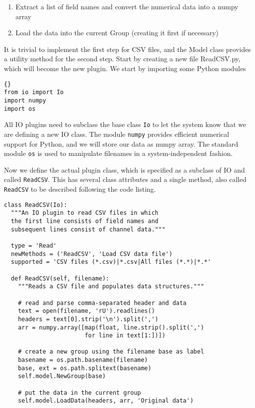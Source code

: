 \documentclass{article}
\begin{document}
\begin{enumerate}
\item Extract a list of field names and convert the numerical data
  into a numpy array
\item Load the data into the current Group (creating it first if necessary)
\end{enumerate}

It is trivial to implement the first step for CSV files, and the Model
class provides a utility method for the second step. Start by creating
a new file ReadCSV.py, which will become the new plugin. We start by
importing some Python modules

\lstset{language=python}
\begin{lstlisting}[]{}
from io import Io
import numpy
import os
\end{lstlisting}

All IO plugins need to subclass the base class \texttt{Io} to let the
system know that we are defining a new IO class. The module
\texttt{numpy} provides efficient numerical support for Python, and we
will store our data as numpy array. The standard module \texttt{os} is
used to manipulate filenames in a system-independent fashion.

Now we define the actual plugin class, which is specified as a
subclass of IO and called \texttt{ReadCSV}. This has several class
attributes and a single method, also called \texttt{ReadCSV} to be
described following the code listing.

\begin{lstlisting}
class ReadCSV(Io):
  """An IO plugin to read CSV files in which 
  the first line consists of field names and 
  subsequent lines consist of channel data."""

  type = 'Read'
  newMethods = ('ReadCSV', 'Load CSV data file')
  supported = 'CSV files (*.csv)|*.csv|All files (*.*)|*.*'
  
  def ReadCSV(self, filename):
    """Reads a CSV file and populates data structures."""
    
    # read and parse comma-separated header and data
    text = open(filename, 'rU').readlines()
    headers = text[0].strip('\n').split(',')
    arr = numpy.array([map(float, line.strip().split(',')
                       for line in text[1:])])

    # create a new group using the filename base as label
    basename = os.path.basename(filename)
    base, ext = os.path.splitext(basename)
    self.model.NewGroup(base)

    # put the data in the current group
    self.model.LoadData(headers, arr, 'Original data')

\end{lstlisting}
\end{document}
